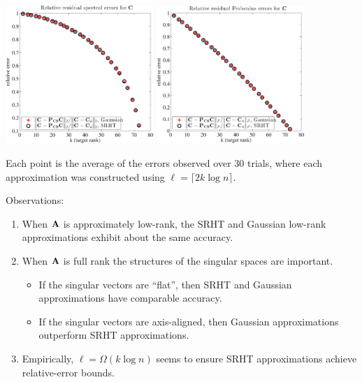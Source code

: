\documentclass[xcolor=x11names,compress,ignorenonframetext]{beamer}
\renewcommand{\(}{\begin{columns}}
\renewcommand{\)}{\end{columns}}
\newcommand{\<}[1]{\begin{column}{#1}}
\renewcommand{\>}{\end{column}}
\begin{document}
 \begin{frame}
\centerline{%
 \includegraphics[width=2.2in, keepaspectratio=true]{experimentC-residual-spectral.pdf}%
 \includegraphics[width=2.2in, keepaspectratio=true]{experimentC-residual-frobenius.pdf}}
 \vspace{1em}
 Each point is the average of the errors observed over 30 trials,
 where each approximation was constructed using $\ell = \lceil 2 k \log n \rceil.$
 \end{frame}

 \begin{frame}
  Observations:
  \begin{enumerate}
   \item When $\mathbf{A}$ is approximately low-rank, the SRHT and Gaussian low-rank approximations exhibit
   about the same accuracy.
   \item When $\mathbf{A}$ is full rank the structures of the singular spaces are important. 
   \begin{itemize} 
   \item If the singular
   vectors are ``flat'', then SRHT and Gaussian approximations have comparable accuracy. 
   \item If the singular
   vectors are axis-aligned, then Gaussian approximations outperform SRHT approximations.
   \end{itemize}
   \item Empirically, $\ell = \Omega(k \log n)$ seems to ensure SRHT approximations achieve relative-error bounds.
  \end{enumerate}

 \end{frame}
 
\end{document}
